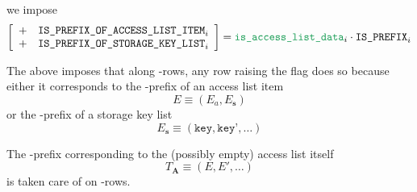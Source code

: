 \begin{description}
	we impose
	\[
	    \left[ \begin{array}{cl}
		+ & \rlpTxnSharedColumnIsPrefixOfAccessListItem _{i} \\
		+ & \rlpTxnSharedColumnIsPrefixOfStorageKeyList _{i} \\
	    \end{array} \right]
	    = \locAccessListData _{i}
	    \cdot
	    \rlpTxnSharedColumnIsPrefix _{i}
	\]
\end{description}
\saNote{}
The above imposes that along \locAccessListData{}-rows, any row raising the
\rlpTxnSharedColumnIsPrefix{} flag does so because either it corresponds to
the \rlp{}-prefix of an access list item
\[
    E \equiv (E_a, E_\textbf{s})
\]
or the \rlp{}-prefix of a storage key list
\[
    E_\textbf{s} \equiv (\texttt{key}, \texttt{key'}, \dots)
\]

\saNote{}
The \rlp{}-prefix corresponding to the (possibly empty) access list itself
\[
    T_\mathbf{A} \equiv (E, E', \dots)
\]
is taken care of on \locAccessListPrefix{}-rows.
